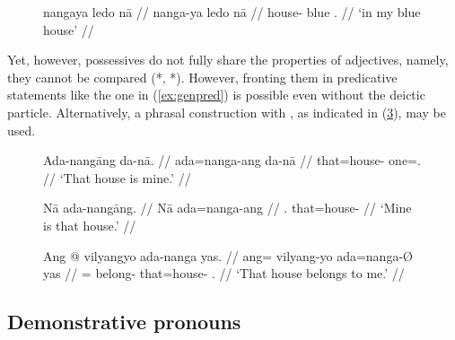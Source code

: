 \begin{figure}[h]
\ex\label{ex:adjgen}%
\begingl
	\gla nangaya ledo nā //
	\glb nanga-ya ledo nā //
	\glc house-\Loc{} blue \Fsg{}.\Gen{} //
	\glft `in my blue house' //
\endgl
\xe
\end{figure}

Yet, however, possessives do not fully share the properties of adjectives,
namely, they cannot be compared (*,
*). However, fronting them in predicative
statements like the one in (\ref{ex:genpred}) is possible even without the
deictic particle. Alternatively, a phrasal construction with
, as indicated in (\ref{ex:genphrase}), may be
used.

\begin{figure}[h]
\pex\label{ex:genpred}
\a\label{ex:genpred_1}\begingl
	\gla Ada-nangāng da-nā. //
	\glb ada=nanga-ang da-nā //
	\glc that=house-\Aarg{} one=\Fsg{}.\Gen{} //
	\glft `That house is mine.' //
\endgl

\a\label{ex:genpred_2}\begingl
	\gla Nā ada-nangāng. //
	\glb Nā ada=nanga-ang //
	\glc \Fsg{}.\Gen{} that=house-\Aarg{} //
	\glft `Mine is that house.' //
\endgl
\xe
\end{figure}

\begin{figure}[h]
\ex\label{ex:genphrase}%
\begingl
	\gla Ang @ vilyangyo ada-nanga yas. //
	\glb ang= vilyang-yo ada=nanga-Ø yas //
	\glc \AgtT{}= belong-\TsgN{} that=house-\Top{} \Fsg{}.\Parg{} //
	\glft `That house belongs to me.' //
\endgl
\xe
\end{figure}


\subsection{Demonstrative pronouns}
\label{subsec:dempro}

